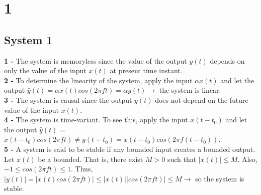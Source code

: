 \documentclass[12pt]{article}
\author{İsmail Enes Bülbül}
\date{October 2022}
\begin{document}



    \section*{1}
    \subsection*{System 1}
    \textbf{1 - }The system is memoryless since the value of the output \(y(t)\) depends on
    only the value of the input \(x(t)\) at present time instant.\\
    \textbf{2 - }To determine the linearity of the system, apply the input \(\alpha x(t)\) and let the
    output \(\hat{y}(t)=\alpha x(t)cos(2\pi ft)=\alpha y(t) \longrightarrow\) the system is linear.\\
    \textbf{3 - }The system is causal since the output \(y(t)\) does not depend on the future
    value of the input \(x(t)\).\\
    \textbf{4 - }The system is time-variant. To see this, apply the input \(x(t-t_0)\) and let the
    output \(\hat{y}(t)\) = \(x(t-t_0)cos(2\pi ft) \neq  y(t-t_0) = x(t-t_0)  cos(2\pi f(t-t_0))\).\\ 
    \textbf{5 - }A system is said to be stable if any bounded input creates a bounded
    output. Let \(x(t)\) be a bounded. That is, there exist \(M > 0\) such that \(\left\lvert x(t)\right\rvert \leq  M\).
    Also, \(-1 \leq cos(2\pi ft) \leq 1\). Thus, \(\left\lvert y(t)\right\rvert  = \left\lvert x(t)cos(2\pi ft)\right\rvert  \leq \left\lvert x(t)\right\rvert \left\lvert cos(2\pi ft)\right\rvert  \leq M \longrightarrow \) so the system is stable. \\
\end{document}
